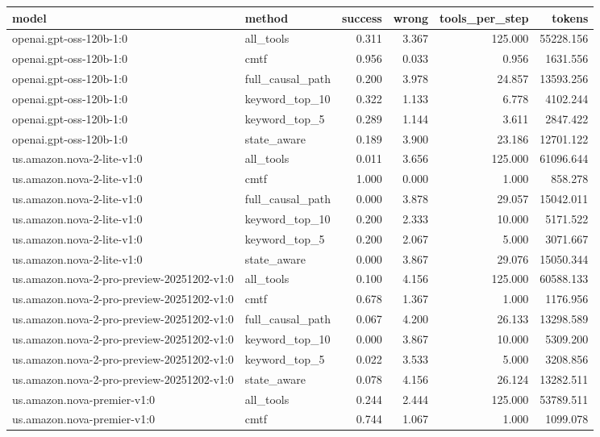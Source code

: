 \begin{tabular}{llrrrr}
\toprule
model & method & success & wrong & tools_per_step & tokens \\
\midrule
openai.gpt-oss-120b-1:0 & all_tools & 0.311 & 3.367 & 125.000 & 55228.156 \\
openai.gpt-oss-120b-1:0 & cmtf & 0.956 & 0.033 & 0.956 & 1631.556 \\
openai.gpt-oss-120b-1:0 & full_causal_path & 0.200 & 3.978 & 24.857 & 13593.256 \\
openai.gpt-oss-120b-1:0 & keyword_top_10 & 0.322 & 1.133 & 6.778 & 4102.244 \\
openai.gpt-oss-120b-1:0 & keyword_top_5 & 0.289 & 1.144 & 3.611 & 2847.422 \\
openai.gpt-oss-120b-1:0 & state_aware & 0.189 & 3.900 & 23.186 & 12701.122 \\
us.amazon.nova-2-lite-v1:0 & all_tools & 0.011 & 3.656 & 125.000 & 61096.644 \\
us.amazon.nova-2-lite-v1:0 & cmtf & 1.000 & 0.000 & 1.000 & 858.278 \\
us.amazon.nova-2-lite-v1:0 & full_causal_path & 0.000 & 3.878 & 29.057 & 15042.011 \\
us.amazon.nova-2-lite-v1:0 & keyword_top_10 & 0.200 & 2.333 & 10.000 & 5171.522 \\
us.amazon.nova-2-lite-v1:0 & keyword_top_5 & 0.200 & 2.067 & 5.000 & 3071.667 \\
us.amazon.nova-2-lite-v1:0 & state_aware & 0.000 & 3.867 & 29.076 & 15050.344 \\
us.amazon.nova-2-pro-preview-20251202-v1:0 & all_tools & 0.100 & 4.156 & 125.000 & 60588.133 \\
us.amazon.nova-2-pro-preview-20251202-v1:0 & cmtf & 0.678 & 1.367 & 1.000 & 1176.956 \\
us.amazon.nova-2-pro-preview-20251202-v1:0 & full_causal_path & 0.067 & 4.200 & 26.133 & 13298.589 \\
us.amazon.nova-2-pro-preview-20251202-v1:0 & keyword_top_10 & 0.000 & 3.867 & 10.000 & 5309.200 \\
us.amazon.nova-2-pro-preview-20251202-v1:0 & keyword_top_5 & 0.022 & 3.533 & 5.000 & 3208.856 \\
us.amazon.nova-2-pro-preview-20251202-v1:0 & state_aware & 0.078 & 4.156 & 26.124 & 13282.511 \\
us.amazon.nova-premier-v1:0 & all_tools & 0.244 & 2.444 & 125.000 & 53789.511 \\
us.amazon.nova-premier-v1:0 & cmtf & 0.744 & 1.067 & 1.000 & 1099.078 \\

\end{tabular}

